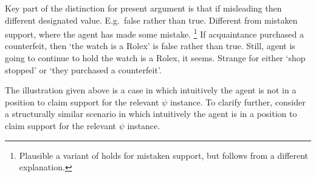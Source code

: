 \begin{note}
  Key part of the distinction for present argument is that if misleading then different designated value.
  E.g.\ false rather than true.
  Different from mistaken support, where the agent has made some mistake.\nolinebreak
  \footnote{
    Plausible a variant of \nI{} holds for mistaken support, but follows from a different explanation.
  }
  If acquaintance purchased a counterfeit, then `the watch is a Rolex' is false rather than true.
  Still, agent is going to continue to hold the watch is a Rolex, it seems.
  Strange for either `shop stopped' or `they purchased a counterfeit'.

  The illustration given above is a case in which intuitively the agent is not in a position to claim support for the relevant \(\psi\) instance.
  To clarify further, consider a structurally similar scenario in which intuitively the agent is in a position to claim support for the relevant \(\psi\) instance.
\end{note}

